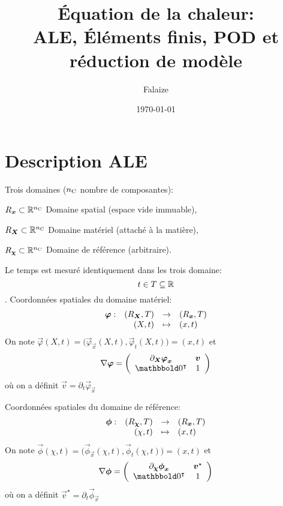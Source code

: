 \documentclass[11pt,a4paper]{article}
\author{Falaize}
\title{Équation de la chaleur: \\ ALE, Éléments finis, POD et réduction de modèle}
\date{\today}
\newcommand{\nc}{{n_{\labelname C}}}
\begin{document}
\maketitle
%
%
%
\section{Description ALE}
%
Trois domaines ($\nc$ nombre de composantes):
\begin{description}
\item $\spacename{R}_{\vec x}\subset \RR^{\nc}$ Domaine spatial (espace vide immuable),
\item $\spacename{R}_{\vec X}\subset \RR^{\nc}$ Domaine matériel (attaché à la matière),
\item $\spacename{R}_{\vec \chi}\subset \RR^{\nc}$ Domaine de référence (arbitraire).
\end{description}
%
Le temps est mesuré identiquement dans les trois domaine: $$t\in T \subseteq {\mathbb{R}}$$.
%
Coordonnées spatiales du domaine matériel:
$$ 
\begin{array}{rrcl}
\boldsymbol{\varphi}: & (R_{\boldsymbol{X}}, T) & \rightarrow & \left(R_{\boldsymbol{x}}, T\right) \\
& (X, t) &  \mapsto & (x , t)
\end{array}
$$
%
On note $\vec{\varphi}(X, t) = \Big(\vec{\varphi}_{\vec x}(X, t), \vec{\varphi}_{t}(X, t) \Big)=(x , t)$ et
%
$$
\nabla\vec \varphi
=
\left(
\begin{array}{cc}
\partial_{\vec X} \vec{\varphi}_{\vec x} & \vec{v}\\
\zeros^\T & 1
\end{array}
\right)
$$%
%
où on a définit $\vec{v} = \partial_{ t} \vec{\varphi}_{\vec x}  $
%

Coordonnées spatiales du domaine de référence:
$$ 
\begin{array}{rrcl}
\boldsymbol{\phi}: & (R_{\boldsymbol{\chi}}, T) & \rightarrow & \left(R_{\boldsymbol{x}}, T\right) \\
& (\chi, t) &  \mapsto & (x , t)
\end{array}
$$
%
On note $\vec{\phi}(\chi, t) = \Big(\vec{\phi}_{\vec x}(\chi, t), \vec{\phi}_{t}(\chi, t) \Big)=(x , t)$ et
%
$$
\nabla\vec \phi
=
\left(
\begin{array}{cc}
\partial_{\vec \chi} \vec{\phi}_{\vec x} & \vec{v}^\star\\
\zeros^\T & 1
\end{array}
\right)
$$%
%
où on a définit $\vec{v}^\star = \partial_{ t} \vec{\phi}_{\vec x}  $
%
\end{document}
